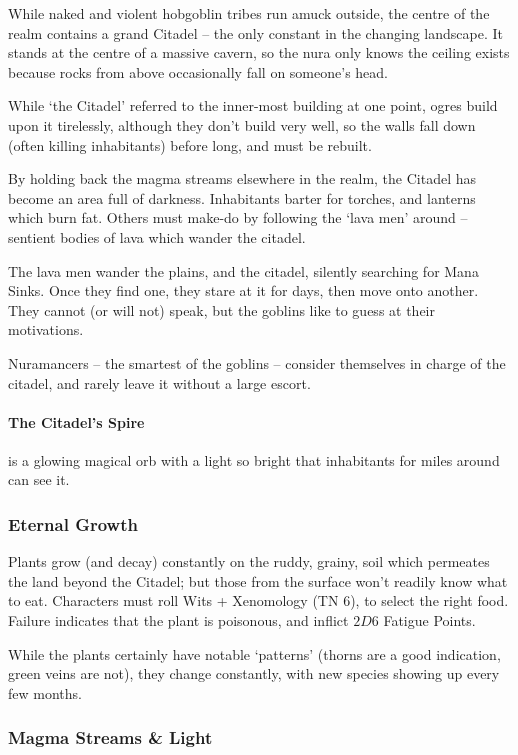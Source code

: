 \begin{multicols}{2}
While naked and violent hobgoblin tribes run amuck outside, the centre of the realm contains a grand Citadel -- the only constant in the changing landscape.
It stands at the centre of a massive cavern, so the nura only knows the ceiling exists because rocks from above occasionally fall on someone's head.

While `the Citadel' referred to the inner-most building at one point, ogres build upon it tirelessly, although they don't build very well, so the walls fall down (often killing inhabitants) before long, and must be rebuilt.

By holding back the magma streams elsewhere in the realm, the Citadel has become an area full of darkness.
Inhabitants barter for torches, and lanterns which burn fat.
Others must make-do by following the `lava men' around -- sentient bodies of lava which wander the citadel.

The lava men wander the plains, and the citadel, silently searching for Mana Sinks.
Once they find one, they stare at it for days, then move onto another.
They cannot (or will not) speak, but the goblins like to guess at their motivations.

Nuramancers -- the smartest of the goblins -- consider themselves in charge of the citadel, and rarely leave it without a large escort.

\paragraph{The Citadel's Spire}
is a glowing magical orb with a light so bright that inhabitants for miles around can see it.

\subsubsection{Eternal Growth}

Plants grow (and decay) constantly on the ruddy, grainy, soil which permeates the land beyond the Citadel; but those from the surface won't readily know what to eat.
Characters must roll Wits + Xenomology (TN 6), to select the right food.
Failure indicates that the plant is poisonous, and inflict $2D6$ Fatigue Points.

While the plants certainly have notable `patterns' (thorns are a good indication, green veins are not), they change constantly, with new species showing up every few months.

\subsubsection{Magma Streams \& Light}


\end{multicols}
